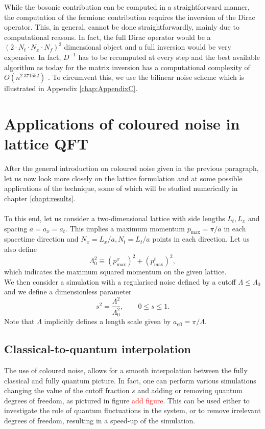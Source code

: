 While the bosonic contribution can be computed in a straightforward manner, the computation of the fermionc contribution requires the inversion of the Dirac operator. This, in general, cannot be done straightforwardly, mainly due to computational reasons.
In fact, the full Dirac operator would be a $(2 \cdot N_t \cdot N_x \cdot N_f)^2$ dimensional object and a full inversion would be very expensive. In fact, $D^{-1}$ has to be recomputed at every step and the best available algorithm as today for the matrix inversion has a computational complexity of $O(n^{2.371552})$ \cite{williams2023new}. To circumvent this, we use the bilinear noise scheme \cite{bilinearnoise1,bilinearnoise2} which is illustrated in Appendix \ref{chap:AppendixC}.

\newpage


\section{Applications of coloured noise in lattice QFT}
\label{sec:lattice_with_coloured_noise}
After the general introduction on coloured noise given in the previous paragraph, let us now look more closely on the lattice formulation and at some possible applications of the technique, some of which will be studied numerically in chapter \ref{chapt:results}. \\~\\
To this end, let us consider a two-dimensional lattice with side lengths $L_t, L_x$ and spacing $a = a_x = a_t$. This implies a maximum momentum $p_\text{max} = \pi / a$ in each spacetime direction and $N_x=L_x/a, N_t=L_t/a$ points in each direction. Let us also define 
\begin{equation}
	\Lambda_0^2 \equiv (p^x_\text{max})^2 + (p^t_\text{max})^2,
\end{equation}
which indicates the maximum squared momentum on the given lattice. \\
We then consider a simulation with a regularised noise defined by a cutoff $\Lambda \leq \Lambda_0$ and we define a dimensionless parameter
\begin{equation}
	s^2 = \frac{\Lambda^2}{\Lambda_0^2}, \qquad 0 \leq s \leq 1.
\end{equation}
Note that $\Lambda$ implicitly defines a length scale given by  $a_\text{eff} = \pi/\Lambda$.\\


\subsection{Classical-to-quantum interpolation}
The use of coloured noise, allows for a smooth interpolation between the fully classical and fully quantum picture. In fact, one can perform various simulations changing the value of the cutoff fraction $s$ and adding or removing quantum degrees of freedom, as pictured in figure \textcolor{red}{add figure}. This can be used either to investigate the role 
of quantum fluctuations in the system, or to remove irrelevant degrees of freedom, resulting in a speed-up of the simulation.

